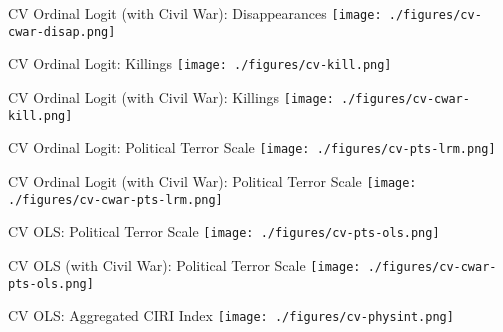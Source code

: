 \documentclass{beamer}
\begin{document}
\begin{frame}{CV Ordinal Logit (with Civil War): Disappearances}
  \centering
  \texttt{[image: ./figures/cv-cwar-disap.png]}
\end{frame}

\begin{frame}{CV Ordinal Logit: Killings}
  \centering
  \texttt{[image: ./figures/cv-kill.png]}
\end{frame}

\begin{frame}{CV Ordinal Logit (with Civil War): Killings}
  \centering
  \texttt{[image: ./figures/cv-cwar-kill.png]}
\end{frame}

\begin{frame}{CV Ordinal Logit: Political Terror Scale}
  \centering
  \texttt{[image: ./figures/cv-pts-lrm.png]}
\end{frame}

\begin{frame}{CV Ordinal Logit (with Civil War): Political Terror Scale}
  \centering
  \texttt{[image: ./figures/cv-cwar-pts-lrm.png]}
\end{frame}

\begin{frame}{CV OLS: Political Terror Scale}
  \centering
  \texttt{[image: ./figures/cv-pts-ols.png]}
\end{frame}

\begin{frame}{CV OLS (with Civil War): Political Terror Scale}
  \centering
  \texttt{[image: ./figures/cv-cwar-pts-ols.png]}
\end{frame}

\begin{frame}{CV OLS: Aggregated CIRI Index}
  \centering
  \texttt{[image: ./figures/cv-physint.png]}
\end{frame}
\end{document}
